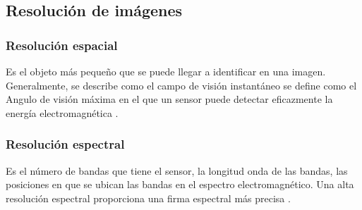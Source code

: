	\subsection{Resolución de imágenes}
	
	\subsubsection{Resolución espacial}
	Es el objeto más pequeño que se puede llegar a identificar en una imagen. Generalmente, se describe como el campo de visión
	instantáneo se define como el Angulo de visión máxima en el que un sensor puede
	detectar eficazmente la energía electromagnética \parencite{camps2011remote}.
	
	\subsubsection{Resolución espectral}
	Es el número de bandas que tiene el sensor, la longitud onda de las bandas, las posiciones en que se ubican las bandas en el espectro electromagnético. Una alta resolución espectral proporciona una firma espectral más precisa \parencite{camps2011remote}.
	
